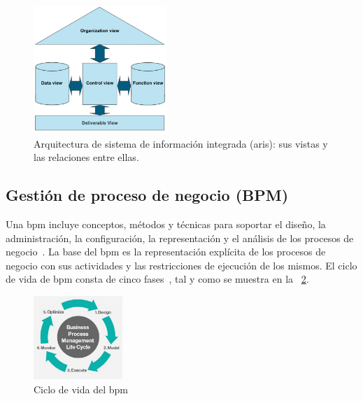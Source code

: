 \begin{figure}
  \centering
  \includegraphics[width=0.45\textwidth]{imaxes/aris.png}
  \caption{Arquitectura de sistema de información integrada (\acrshort{aris}): sus vistas y las relaciones entre ellas.}
  \label{fig:aris}
\end{figure}


\subsection{Gestión de proceso de negocio (BPM)}

Una \acrshort{bpm} incluye conceptos, métodos y técnicas para soportar el diseño, la administración, la configuración, la representación y el análisis de los procesos de negocio~\cite{Weske}.
La base del \acrshort{bpm} es la representación explícita de los procesos de negocio con sus actividades y las restricciones de ejecución de los mismos.
El ciclo de vida de \acrshort{bpm} consta de cinco fases~\cite{bpmLifecycle}, tal y como se muestra en la \figurename~\ref{fig:lifecycle-bpm}.

\begin{figure}
  \centering
  \includegraphics[width=0.30\textwidth]{imaxes/bpm-lifecycle.png}
  \caption{Ciclo de vida del \acrshort{bpm}}
  \label{fig:lifecycle-bpm}
\end{figure}


